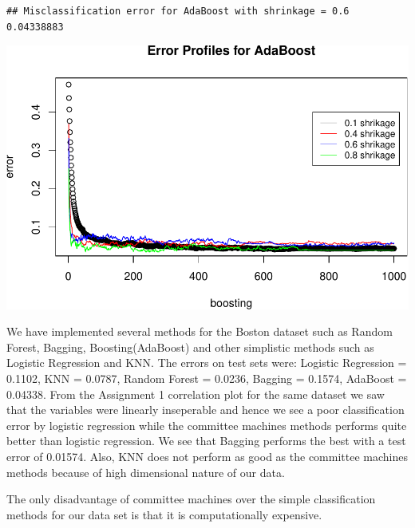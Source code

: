 \documentclass[]{article}
\begin{document}
\begin{verbatim}
## Misclassification error for AdaBoost with shrinkage = 0.6 0.04338883
\end{verbatim}

\includegraphics{HW4_Solution_files/figure-latex/unnamed-chunk-17-1.pdf}

We have implemented several methods for the Boston dataset such as
Random Forest, Bagging, Boosting(AdaBoost) and other simplistic methods
such as Logistic Regression and KNN. The errors on test sets were:
Logistic Regression = 0.1102, KNN = 0.0787, Random Forest = 0.0236,
Bagging = 0.1574, AdaBoost = 0.04338. From the Assignment 1 correlation
plot for the same dataset we saw that the variables were linearly
inseperable and hence we see a poor classification error by logistic
regression while the committee machines methods performs quite better
than logistic regression. We see that Bagging performs the best with a
test error of 0.01574. Also, KNN does not perform as good as the
committee machines methods because of high dimensional nature of our
data.

The only disadvantage of committee machines over the simple
classification methods for our data set is that it is computationally
expensive.
\end{document}
